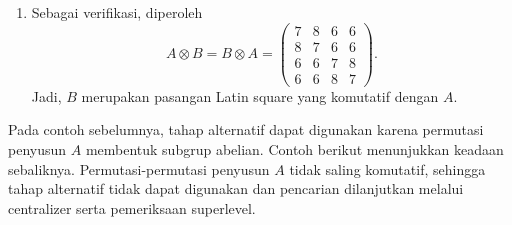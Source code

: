 \begin{contoh}
\begin{enumerate}
    \item Sebagai verifikasi, diperoleh
          \[
            A\otimes B
            =
            B\otimes A
            =
            \begin{pmatrix}
              7 & 8 & 6 & 6 \\
              8 & 7 & 6 & 6 \\
              6 & 6 & 7 & 8 \\
              6 & 6 & 8 & 7
            \end{pmatrix}.
          \]
          Jadi, $B$ merupakan pasangan Latin square yang komutatif dengan $A$.
  \end{enumerate}
\end{contoh}

Pada contoh sebelumnya, tahap alternatif dapat digunakan karena permutasi
penyusun $A$ membentuk subgrup abelian. Contoh berikut menunjukkan keadaan
sebaliknya. Permutasi-permutasi penyusun $A$ tidak saling komutatif, sehingga
tahap alternatif tidak dapat digunakan dan pencarian dilanjutkan melalui
centralizer serta pemeriksaan superlevel.

